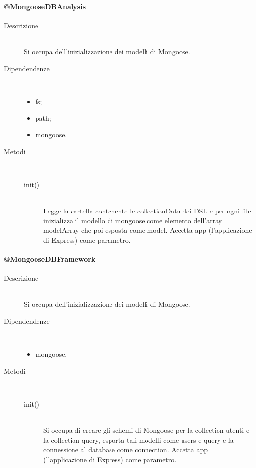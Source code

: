 \paragraph{@MongooseDBAnalysis}
\begin{description}
 \item[Descrizione] \hfill \\
 Si occupa dell'inizializzazione dei modelli di Mongoose.
 \item[Dipendendenze] \hfill \\
    \begin{itemize}
    \item fs;
    \item path;
    \item mongoose.
    \end{itemize}
\item[Metodi] \hfill \\
 \begin{description}
 \item[init()] \hfill \\
 Legge la cartella contenente le collectionData dei DSL e per ogni file inizializza il modello di mongoose come elemento dell'array modelArray che poi esposta come model. Accetta app (l'applicazione di Express) come parametro.
 \end{description}
\end{description}

\paragraph{@MongooseDBFramework}
\begin{description}
 \item[Descrizione] \hfill \\
 Si occupa dell'inizializzazione dei modelli di Mongoose.
  \item[Dipendendenze] \hfill \\
  \begin{itemize}
  \item mongoose.
  \end{itemize}
\item[Metodi] \hfill \\
 \begin{description}
 \item[init()] \hfill \\
 Si occupa di creare gli schemi di Mongoose per la collection utenti e la collection query, esporta tali modelli come users e query e la connessione al database come connection. Accetta app (l'applicazione di Express) come parametro.
 \end{description}
\end{description}

